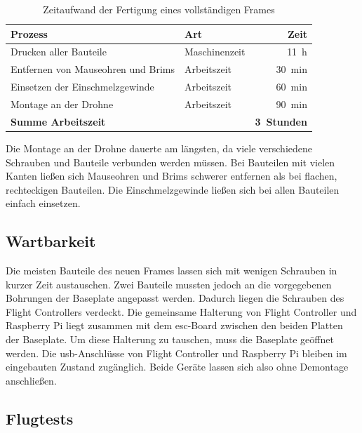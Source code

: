        \begin{table}[H]
            \centering
            \caption{Zeitaufwand der Fertigung eines vollständigen Frames}
            \label{tab:Erg_Fertigung}
            \begin{tabularx}{\textwidth}{X l r}
                \toprule
                \textbf{Prozess} & \textbf{Art} & \textbf{Zeit} \\
                \midrule
                Drucken aller Bauteile & Maschinenzeit & 11~h \\
                Entfernen von Mauseohren und Brims & Arbeitszeit & 30~min \\
                Einsetzen der Einschmelzgewinde & Arbeitszeit & 60~min \\
                Montage an der Drohne & Arbeitszeit & 90~min \\
                \midrule
                \textbf{Summe Arbeitszeit} & & \textbf{3~Stunden} \\
                \bottomrule
            \end{tabularx}
        \end{table}

        Die Montage an der Drohne dauerte am längsten, da viele verschiedene Schrauben und Bauteile verbunden werden müssen. Bei Bauteilen mit vielen Kanten ließen sich Mauseohren und Brims schwerer entfernen als bei flachen, rechteckigen Bauteilen. Die Einschmelzgewinde ließen sich bei allen Bauteilen einfach einsetzen.

        \subsection{Wartbarkeit}
        \label{sec:Erg_Frame_Wartung}

        Die meisten Bauteile des neuen Frames lassen sich mit wenigen Schrauben in kurzer Zeit austauschen. Zwei Bauteile mussten jedoch an die vorgegebenen Bohrungen der Baseplate angepasst werden. Dadurch liegen die Schrauben des Flight Controllers verdeckt. Die gemeinsame Halterung von Flight Controller und Raspberry Pi liegt zusammen mit dem \gls{esc}-Board zwischen den beiden Platten der Baseplate. Um diese Halterung zu tauschen, muss die Baseplate geöffnet werden. Die \gls{usb}-Anschlüsse von Flight Controller und Raspberry Pi bleiben im eingebauten Zustand zugänglich. Beide Geräte lassen sich also ohne Demontage anschließen. %

        \subsection{Flugtests}
        \label{sec:Erg_Frame_Flug}

